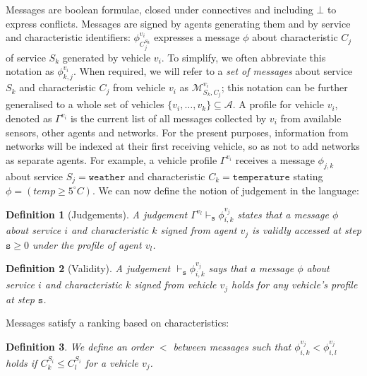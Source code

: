 \documentclass[compsoc, conference, letterpaper, 10pt, times]{IEEEtran}
\newtheorem{definition}{Definition}
\begin{document}
Messages are boolean formulae, closed under connectives and including $\bot$ to express conflicts. Messages are signed by agents generating them and by service and characteristic identifiers: $\phi^{v_{i}}_{C^{S_{k}}_{j}}$ expresses a  message $\phi$ about characteristic $C_j$ of service $S_k$  generated by vehicle $v_{i}$.  To simplify, we often abbreviate this notation as $\phi^{v_{i}}_{k,j}$.  When required, we will refer to a \textit{set of messages} about service $S_{k}$ and characteristic $C_{j}$ from vehicle $v_{i}$ as $\mathcal{M}^{v_{i}}_{S_{k}, C_{j}}$; this notation can be further generalised to a whole set of vehicles $\{v_{i}, \dots, v_{k}\} \subseteq  \mathcal{A}$. 
%
A profile for vehicle $v_{i}$, denoted as $\Gamma^{v_{i}}$ is the current list of all messages collected by $v_{i}$ from available sensors, other agents and networks. For the present purposes, information from networks will be indexed at their first receiving vehicle, so as not to add networks as separate agents. For example, a vehicle profile $\Gamma^{v_{i}}$ receives a message $\phi_{j,k}$ about service $S_{j}=\mathtt{weather}$ and characteristic $C_{k}=\mathtt{temperature}$ stating $\phi= (temp \geq 5^\circ C)$. We can now define the notion of judgement in the language:


\begin{definition}[Judgements]
A judgement $\Gamma^{v_l} \vdash_{\mathtt{s}} \phi^{v_{j}}_{i,k}$ states that a message $\phi$ about service $i$ and characteristic $k$ signed from agent $v_{j}$  is validly accessed at step $\mathtt{s}\geq 0$ under the profile of agent $v_{l}$.
\end{definition}

\begin{definition}[Validity]
A judgement $\vdash_{\mathtt{s}} \phi^{v_{j}}_{i,k}$ says that a message $\phi$  about service $i$ and characteristic $k$ signed from vehicle $v_{j}$ holds for \textit{any} vehicle's profile at step $\mathtt{s}$.
\end{definition}

Messages satisfy a ranking based on characteristics:

\begin{definition}\label{def:dependencypackages}
We define an order $<$ between messages such that $\phi^{v_{j}}_{i,k}<\phi^{v_{j}}_{i,l}$ holds if $C^{S_{i}}_{k}\leq C^{S_{i}}_{l}$ for a vehicle $v_{j}$.
%
\end{definition}
\end{document}
